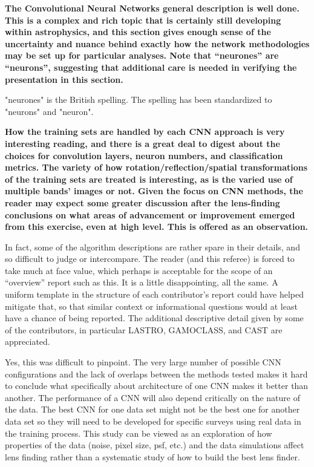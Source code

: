 \documentclass[11pt,a4paper]{article}
\begin{document}
{\bf
The Convolutional Neural Networks general description is well done.  This is a complex and rich topic that is certainly still developing within astrophysics, and this section gives enough sense of the uncertainty and nuance behind exactly how the network methodologies may be set up for particular analyses.  Note that “neurones” are “neurons”, suggesting that additional care is needed in verifying the presentation in this section.   
}

"neurones" is the British spelling.  The spelling has been standardized to "neurons" and "neuron". 

{\bf
How the training sets are handled by each CNN approach is very interesting reading, and there is a great deal to digest about the choices for convolution layers, neuron numbers, and classification metrics.  The variety of how rotation/reflection/spatial transformations of the training sets are treated is interesting, as is the varied use of multiple bands’ images or not.  Given the focus on CNN methods, the reader may expect some greater discussion after the lens-finding conclusions on what areas of advancement or improvement emerged from this exercise, even at high level.   This is offered as an observation.  

In fact, some of the algorithm descriptions are rather spare in their details, and so difficult to judge or intercompare.  The reader (and this referee) is forced to take much at face value, which perhaps is acceptable for the scope of an “overview” report such as this.  It is a little disappointing, all the same.  A uniform template in the structure of each contributor’s report could have helped mitigate that, so that similar context or informational questions would at least have a chance of being reported.  The additional descriptive detail given by some of the contributors, in particular LASTRO, GAMOCLASS, and CAST are appreciated. 
}

Yes, this was difficult to pinpoint.  The very large number of possible CNN configurations and the lack of overlaps between the methods tested makes it hard to conclude what specifically about architecture of one CNN makes it better than another.   The performance of a CNN will also depend critically on the nature of the data.  The best CNN for one data set might not be the best one for another data set so they will need to be developed for specific surveys using real data in the training process.  This study can be 
viewed as an exploration of how properties of the data (noise, pixel size, psf, etc.) and the data simulations affect lens finding rather than a systematic study of how to build the best lens finder.
\end{document}
